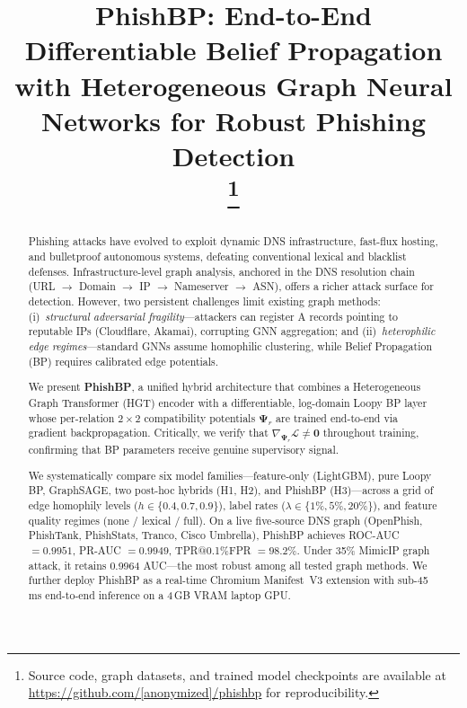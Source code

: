 \documentclass[conference]{IEEEtran}
\begin{document}
\title{PhishBP: End-to-End Differentiable Belief Propagation with
Heterogeneous Graph Neural Networks for Robust Phishing Detection\\
\thanks{Source code, graph datasets, and trained model checkpoints are
available at \url{https://github.com/[anonymized]/phishbp} for reproducibility.}
}

\author{
}

\maketitle

\begin{abstract}
Phishing attacks have evolved to exploit dynamic DNS infrastructure, fast-flux
hosting, and bulletproof autonomous systems, defeating conventional lexical and
blacklist defenses. Infrastructure-level graph analysis, anchored in the DNS
resolution chain (URL $\to$ Domain $\to$ IP $\to$ Nameserver $\to$ ASN), offers
a richer attack surface for detection. However, two persistent challenges limit
existing graph methods: (i)~\emph{structural adversarial fragility}---attackers
can register A records pointing to reputable IPs (Cloudflare, Akamai), corrupting
GNN aggregation; and (ii)~\emph{heterophilic edge regimes}---standard GNNs
assume homophilic clustering, while Belief Propagation (BP) requires calibrated
edge potentials.

We present \textbf{PhishBP}, a unified hybrid architecture that combines a
Heterogeneous Graph Transformer (HGT) encoder with a differentiable, log-domain
Loopy BP layer whose per-relation $2 \times 2$ compatibility potentials
$\boldsymbol{\Psi}_r$ are trained end-to-end via gradient backpropagation.
Critically, we verify that $\nabla_{\boldsymbol{\Psi}_r}\mathcal{L} \neq
\mathbf{0}$ throughout training, confirming that BP parameters receive genuine
supervisory signal.

We systematically compare six model families---feature-only (LightGBM), pure
Loopy BP, GraphSAGE, two post-hoc hybrids (H1, H2), and PhishBP
(H3)---across a grid of edge homophily levels ($h \in \{0.4, 0.7, 0.9\}$),
label rates ($\lambda \in \{1\%, 5\%, 20\%\}$), and feature quality regimes
(none / lexical / full). On a live five-source DNS graph (OpenPhish, PhishTank,
PhishStats, Tranco, Cisco Umbrella), PhishBP achieves ROC-AUC $= 0.9951$,
PR-AUC $= 0.9949$, TPR@0.1\%FPR $= 98.2\%$. Under 35\% MimicIP graph attack,
it retains 0.9964 AUC---the most robust among all tested graph methods. We
further deploy PhishBP as a real-time Chromium Manifest~V3 extension with
sub-45\,ms end-to-end inference on a 4\,GB VRAM laptop GPU.
\end{abstract}
\end{document}
